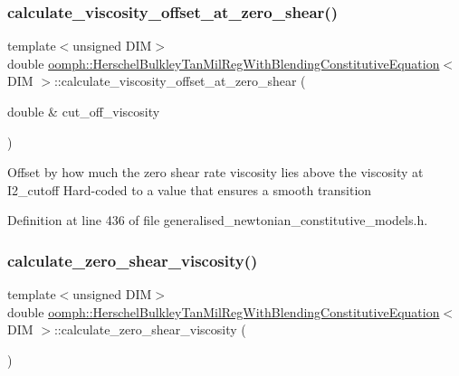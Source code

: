 \subsubsection{\texorpdfstring{calculate\+\_\+viscosity\+\_\+offset\+\_\+at\+\_\+zero\+\_\+shear()}{calculate\_viscosity\_offset\_at\_zero\_shear()}}
{\footnotesize\ttfamily template$<$unsigned D\+IM$>$ \\
double \hyperlink{classoomph_1_1HerschelBulkleyTanMilRegWithBlendingConstitutiveEquation}{oomph\+::\+Herschel\+Bulkley\+Tan\+Mil\+Reg\+With\+Blending\+Constitutive\+Equation}$<$ D\+IM $>$\+::calculate\+\_\+viscosity\+\_\+offset\+\_\+at\+\_\+zero\+\_\+shear (\begin{DoxyParamCaption}\item[{double \&}]{cut\+\_\+off\+\_\+viscosity }\end{DoxyParamCaption})\hspace{0.3cm}{\ttfamily [inline]}}

Offset by how much the zero shear rate viscosity lies above the viscosity at I2\+\_\+cutoff Hard-\/coded to a value that ensures a smooth transition 

Definition at line 436 of file generalised\+\_\+newtonian\+\_\+constitutive\+\_\+models.\+h.

\mbox{\label{classoomph_1_1HerschelBulkleyTanMilRegWithBlendingConstitutiveEquation_abdb90aeb25f63f03cef5e0a070da0cd5}} 
\subsubsection{\texorpdfstring{calculate\+\_\+zero\+\_\+shear\+\_\+viscosity()}{calculate\_zero\_shear\_viscosity()}}
{\footnotesize\ttfamily template$<$unsigned D\+IM$>$ \\
double \hyperlink{classoomph_1_1HerschelBulkleyTanMilRegWithBlendingConstitutiveEquation}{oomph\+::\+Herschel\+Bulkley\+Tan\+Mil\+Reg\+With\+Blending\+Constitutive\+Equation}$<$ D\+IM $>$\+::calculate\+\_\+zero\+\_\+shear\+\_\+viscosity (\begin{DoxyParamCaption}{ }\end{DoxyParamCaption})\hspace{0.3cm}{\ttfamily [inline]}}



